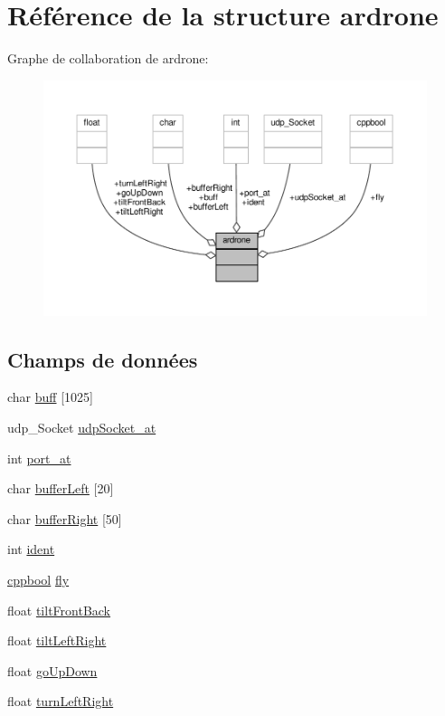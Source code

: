 \hypertarget{structardrone}{\section{Référence de la structure ardrone}
\label{structardrone}
}


Graphe de collaboration de ardrone\-:\nopagebreak
\begin{figure}[H]
\begin{center}
\leavevmode
\includegraphics[width=350pt]{structardrone__coll__graph}
\end{center}
\end{figure}
\subsection*{Champs de données}
\begin{DoxyCompactItemize}
\item 
char \hyperlink{structardrone_a825d10649a532df1970c816b4070c690}{buff} \mbox{[}1025\mbox{]}
\item 
udp\-\_\-\-Socket \hyperlink{structardrone_acb3a788ee7164c5350b4bfd7d8312772}{udp\-Socket\-\_\-at}
\item 
int \hyperlink{structardrone_a57f99d232635ffded0d59ea9475639a2}{port\-\_\-at}
\item 
char \hyperlink{structardrone_a800e0449117874d9d1ff10965cdd346f}{buffer\-Left} \mbox{[}20\mbox{]}
\item 
char \hyperlink{structardrone_adcadf1aaae5c4a2ab78bed2f4d77346b}{buffer\-Right} \mbox{[}50\mbox{]}
\item 
int \hyperlink{structardrone_a52e7dc3872878f8c40cd3523fed00c80}{ident}
\item 
\hyperlink{group___a_t_commands_ga58b930fb43c5cd2fc89a84647e6fe51c}{cppbool} \hyperlink{structardrone_a9d1fad21c1121fc07e7f54ae86754cac}{fly}
\item 
float \hyperlink{structardrone_a97a469c16f6798fa7e85ad88a725bdaa}{tilt\-Front\-Back}
\item 
float \hyperlink{structardrone_ae7202985f7f7b5088481dff26f52e319}{tilt\-Left\-Right}
\item 
float \hyperlink{structardrone_a0aeff16c8eb63da12be0a1b57bc10487}{go\-Up\-Down}
\item 
float \hyperlink{structardrone_ad2830725ca67f509c4dd63caf152e8f6}{turn\-Left\-Right}
\end{DoxyCompactItemize}


